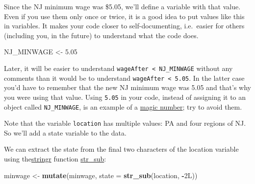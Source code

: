 \documentclass[]{book}
\newenvironment{Shaded}{\begin{snugshade}}{\end{snugshade}}
\newcommand{\KeywordTok}[1]{\textcolor[rgb]{0.13,0.29,0.53}{\textbf{#1}}}
\newcommand{\DataTypeTok}[1]{\textcolor[rgb]{0.13,0.29,0.53}{#1}}
\newcommand{\FloatTok}[1]{\textcolor[rgb]{0.00,0.00,0.81}{#1}}
\newcommand{\StringTok}[1]{\textcolor[rgb]{0.31,0.60,0.02}{#1}}
\newcommand{\CommentTok}[1]{\textcolor[rgb]{0.56,0.35,0.01}{\textit{#1}}}
\newcommand{\OperatorTok}[1]{\textcolor[rgb]{0.81,0.36,0.00}{\textbf{#1}}}
\newcommand{\NormalTok}[1]{#1}
\theoremstyle{definition}
\theoremstyle{definition}
\theoremstyle{definition}
\theoremstyle{remark}
\begin{document}
Since the NJ minimum wage was \$5.05, we'll define a variable with that
value. Even if you use them only once or twice, it is a good idea to put
values like this in variables. It makes your code closer to
self-documenting, i.e.~easier for others (including you, in the future)
to understand what the code does.

\begin{Shaded}
\begin{Highlighting}[]
\NormalTok{NJ_MINWAGE <-}\StringTok{ }\FloatTok{5.05}
\end{Highlighting}
\end{Shaded}

Later, it will be easier to understand
\texttt{wageAfter\ \textless{}\ NJ\_MINWAGE} without any comments than
it would be to understand \texttt{wageAfter\ \textless{}\ 5.05}. In the
latter case you'd have to remember that the new NJ minimum wage was 5.05
and that's why you were using that value. Using \texttt{5.05} in your
code, instead of assigning it to an object called \texttt{NJ\_MINWAGE},
is an example of a
\href{https://en.wikipedia.org/wiki/Magic_number_(programming)\#Unnamed_numerical_constants}{magic
number}; try to avoid them.

Note that the variable \texttt{location} has multiple values: PA and
four regions of NJ. So we'll add a state variable to the data.

\begin{Shaded}
\end{Shaded}

We can extract the state from the final two characters of the location
variable using
the\href{https://cran.r-project.org/package=stringr}{stringr} function
\href{https://www.rdocumentation.org/packages/stringr/topics/str_sub}{str\_sub}:

\begin{Shaded}
\begin{Highlighting}[]
\NormalTok{minwage <-}
\StringTok{  }\KeywordTok{mutate}\NormalTok{(minwage, }\DataTypeTok{state =} \KeywordTok{str_sub}\NormalTok{(location, }\OperatorTok{-}\NormalTok{2L))}
\end{Highlighting}
\end{Shaded}
\end{document}
